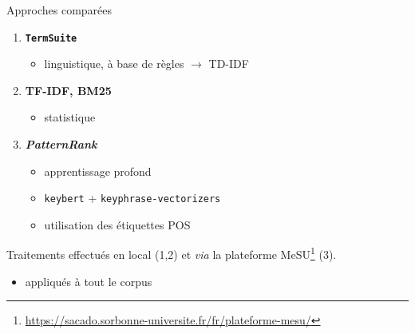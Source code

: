 \begin{frame}{Approches comparées}
	\begin{enumerate}
		\item \textcolor{deepblue}{\textbf{\texttt{TermSuite}}}
		\begin{itemize}
			\item linguistique, à base de règles $\rightarrow$ TD-IDF
		\end{itemize} 
		\item \textcolor{deepblue}{\textbf{TF-IDF, BM25}}
		\begin{itemize}
			\item statistique
		\end{itemize}
		\item \textcolor{deepblue}{\textbf{\textit{PatternRank}}} \citep{schopf2022}
		\begin{itemize}
			\item apprentissage profond
			\item \texttt{keybert} + \texttt{keyphrase-vectorizers}
			\item utilisation des étiquettes POS
		\end{itemize} 
	\end{enumerate}
	
	\begin{block}{\vspace*{-0.6mm}}
		Traitements effectués en local (1,2) et \textit{via} la plateforme MeSU\footnote{\url{https://sacado.sorbonne-universite.fr/fr/plateforme-mesu/}} (3).
		\begin{itemize}
			\item appliqués à tout le corpus
		\end{itemize}
	\end{block}
	
\end{frame}